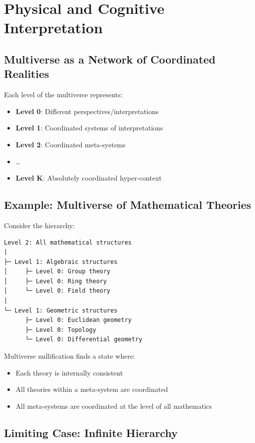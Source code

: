 \documentclass[12pt,a4paper]{article}
\begin{document}
\section{Physical and Cognitive Interpretation}

\subsection{Multiverse as a Network of Coordinated Realities}

Each level of the multiverse represents:
\begin{itemize}
    \item \textbf{Level 0}: Different perspectives/interpretations
    \item \textbf{Level 1}: Coordinated systems of interpretations
    \item \textbf{Level 2}: Coordinated meta-systems
    \item \ldots
    \item \textbf{Level K}: Absolutely coordinated hyper-context
\end{itemize}

\subsection{Example: Multiverse of Mathematical Theories}

Consider the hierarchy:
\begin{verbatim}
Level 2: All mathematical structures
|
├─ Level 1: Algebraic structures
│     ├─ Level 0: Group theory
│     ├─ Level 0: Ring theory
│     └─ Level 0: Field theory
|
└─ Level 1: Geometric structures
      ├─ Level 0: Euclidean geometry
      ├─ Level 0: Topology
      └─ Level 0: Differential geometry
\end{verbatim}

Multiverse nullification finds a state where:
\begin{itemize}
    \item Each theory is internally consistent
    \item All theories within a meta-system are coordinated
    \item All meta-systems are coordinated at the level of all mathematics
\end{itemize}

\subsection{Limiting Case: Infinite Hierarchy}
\end{document}

